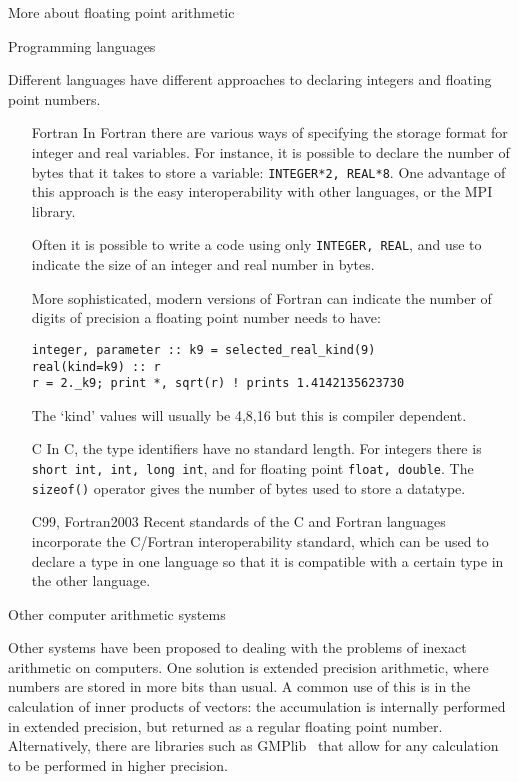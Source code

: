 
 {More about floating point arithmetic}

 {Programming languages}

Different languages have different approaches to declaring integers and
floating point numbers.
\begin{itemize}
\item [Fortran] In Fortran there are
  various ways of specifying the storage format for integer and real
  variables. For instance, it is possible to declare
   the number of bytes that it takes to store a variable:
  \texttt{INTEGER*2, REAL*8}. One advantage of this approach is the
  easy interoperability with other languages, or the MPI library.

  Often it is possible to write a code
  using only \texttt{INTEGER, REAL}, and use
   to indicate the size of an integer
  and real number in bytes.

  More sophisticated, modern versions of Fortran can indicate the
  number of digits of precision a floating point number needs to have:
\begin{verbatim}
integer, parameter :: k9 = selected_real_kind(9)
real(kind=k9) :: r
r = 2._k9; print *, sqrt(r) ! prints 1.4142135623730
\end{verbatim}
  The `kind' values will usually be 4,8,16 but this is compiler
  dependent.
\item [C] In C, the type identifiers have no standard length. For
  integers there is \texttt{short int, int, long int}, and for
  floating point \texttt{float, double}. The \texttt{sizeof()}
  operator gives the number of bytes used to store a datatype.
\item [C99, Fortran2003] Recent standards of the C and Fortran
  languages incorporate the C/Fortran interoperability standard, which
  can be used to declare a type in one language so that it is
  compatible with a certain type in the other language.
\end{itemize}

 {Other computer arithmetic systems}

Other systems have been proposed to dealing with the problems of
inexact arithmetic on computers. One solution is extended precision
arithmetic, where numbers are stored in more bits than usual. A common
use of this is in the calculation of inner products of vectors: the
accumulation is internally performed in extended precision, but
returned as a regular floating point number. Alternatively, there are
libraries such as GMPlib~\cite{gmplib} that allow for any calculation
to be performed in higher precision.

